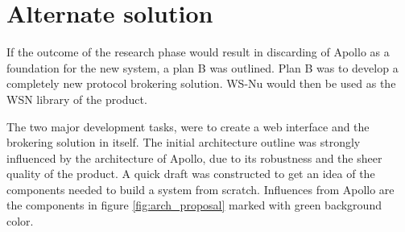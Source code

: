 \begin{table}[ht!]
\centering
{}
\caption{Risk analysis for building the system based on Apollo}
\label{tab:risk_analysis_apollo}
\end{table}

\section{Alternate solution}
\label{sec:prestudies-alternate_solution}

If the outcome of the research phase would result in discarding of Apollo as a foundation for the new system, a plan B was outlined. Plan B was to develop a completely new protocol brokering solution. WS-Nu would then be used as the WSN library of the product. 

The two major development tasks, were to create a web interface and the brokering solution in itself. The initial architecture outline was strongly influenced by the architecture of Apollo, due to its robustness and the sheer quality of the product. A quick draft was constructed to get an idea of the components needed to build a system from scratch. Influences from Apollo are the components in figure \ref{fig:arch_proposal} marked with green background color.

